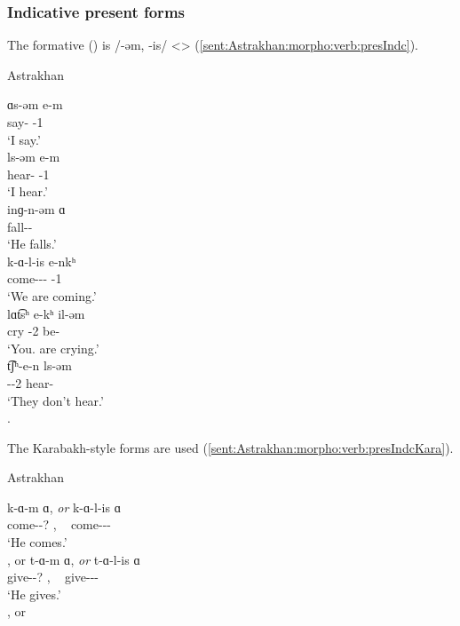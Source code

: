 \subsubsection{Indicative present forms}

The formative () is /-əm, -is/ <> (\ref{sent:Astrakhan:morpho:verb:presIndc}).

\begin{exe}
	\ex Astrakhan \label{sent:Astrakhan:morpho:verb:presIndc}
	\begin{xlist}
		\ex \gll ɑs-əm e-m \\
		say-{\impfcvb} {\aux}-1{\sg} \\
		\trans `I say.'\\
		\ex \gll ls-əm e-m \\
		hear-{\impfcvb} {\aux}-1{\sg} \\
		\trans `I hear.'\\
		\ex \gll inɡ-n-əm ɑ \\
		fall-{\vx}-{\impfcvb} {\aux} \\
		\trans `He falls.'\\
		\ex \gll k-ɑ-l-is e-nkʰ \\
		come-{\thgloss}-{\infgloss}-{\impfcvb} {\aux}-1{\pl} \\
		\trans `We are coming.'\\
		\ex \gll lɑt͡sʰ e-kʰ il-əm \\
		cry {\aux}-2{\pl} be-{\impfcvb} \\
		\trans `You.{\pl} are crying.'\\
		\ex \gll t͡ʃʰ-e-n ls-əm \\
		{\neggloss}-{\aux}-2{\pl} hear-{\impfcvb} \\
		\trans `They don't hear.'\\
		.
	\end{xlist}
\end{exe}

The Karabakh-style forms are used (\ref{sent:Astrakhan:morpho:verb:presIndcKara}). 

\begin{exe}
	\ex Astrakhan \label{sent:Astrakhan:morpho:verb:presIndcKara}
	\begin{xlist}
		\ex \gll k-ɑ-m ɑ, \textit{or} k-ɑ-l-is ɑ \\
		come-{\thgloss}-? {\aux}, ~ come-{\thgloss}-{\infgloss}-{\impfcvb} {\aux} \\
		\trans `He comes.'\\
		, or \armenian{կալիս ա}
		\ex \gll t-ɑ-m ɑ, \textit{or} t-ɑ-l-is ɑ \\
		give-{\thgloss}-? {\aux}, ~ give-{\thgloss}-{\infgloss}-{\impfcvb} {\aux} \\
		\trans `He gives.'\\
		, or \armenian{տալիս ա} 
	\end{xlist}
\end{exe}

